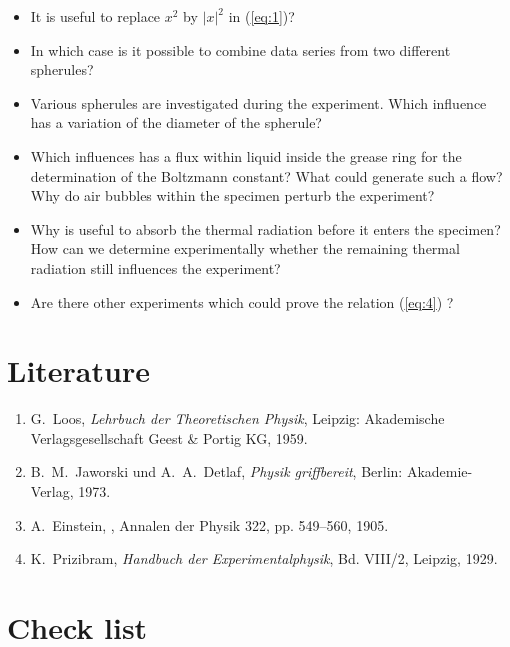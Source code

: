 \documentclass{tudphygp_eng}
\begin{document}
\begin{itemize}
\item It is useful to replace $x^2$ by $|x|^2$ in (\ref{eq:1})?

\item In which case is it possible to combine data series from two different spherules?

\item Various spherules are investigated during the experiment. Which influence has a variation of the diameter of the spherule?

\item Which influences has a flux within liquid inside the grease ring for the determination of the Boltzmann constant? What could generate such a flow? Why do air bubbles within the specimen perturb the experiment?

\item Why is useful to absorb the thermal radiation before it enters the specimen? How can we determine experimentally whether the remaining thermal radiation still influences the experiment?

\item Are there other experiments which could prove the relation (\ref{eq:4}) ?

\end{itemize}

\section{Literature}

\begin{enumerate}
 \item G.~Loos, {\em Lehrbuch der Theoretischen Physik}, Leipzig: Akademische Verlagsgesellschaft Geest \& Portig KG, 1959. 
 
 \item B.~M.~Jaworski und A.~A.\ Detlaf, {\em Physik griffbereit}, Berlin: Akademie-Verlag, 1973. 
 
 \item A.~Einstein, \grqq, Annalen der Physik 322, pp. 549--560, 1905. 
 
 \item K.~Prizibram, {\em Handbuch der Experimentalphysik}, Bd. VIII/2, Leipzig, 1929. 

\end{enumerate}

\section{Check list}
\end{document}
